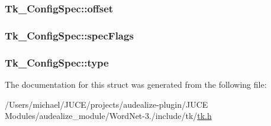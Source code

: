 \subsubsection[{\texorpdfstring{offset}{offset}}]{ Tk\+\_\+\+Config\+Spec\+::offset}\hypertarget{struct_tk___config_spec_acd6e8e61c4363aa9bf961791f32b77a2}{}\label{struct_tk___config_spec_acd6e8e61c4363aa9bf961791f32b77a2}
\subsubsection[{\texorpdfstring{spec\+Flags}{specFlags}}]{ Tk\+\_\+\+Config\+Spec\+::spec\+Flags}\hypertarget{struct_tk___config_spec_a660c0a0ea239a8241157115eb3331a5a}{}\label{struct_tk___config_spec_a660c0a0ea239a8241157115eb3331a5a}
\subsubsection[{\texorpdfstring{type}{type}}]{ Tk\+\_\+\+Config\+Spec\+::type}\hypertarget{struct_tk___config_spec_a8c15f842b9585b72d6d410b9940fb466}{}\label{struct_tk___config_spec_a8c15f842b9585b72d6d410b9940fb466}


The documentation for this struct was generated from the following file\+:\begin{DoxyCompactItemize}
\item 
/\+Users/michael/\+J\+U\+C\+E/projects/audealize-\/plugin/\+J\+U\+C\+E Modules/audealize\+\_\+module/\+Word\+Net-\/3./include/tk/\hyperlink{tk_8h}{tk.\+h}\end{DoxyCompactItemize}
